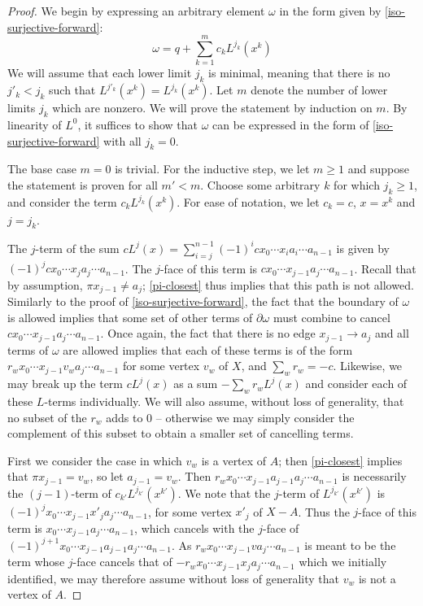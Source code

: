 \documentclass[11pt]{article}
\theoremstyle{definition}
\numberwithin{equation}{section}
\newcommand{\bd}{\partial}
\begin{document}
\begin{proof}
We begin by expressing an arbitrary element $\omega$ in the form given by \cref{iso-surjective-forward}:
\[
\omega = q + \sum_{k=1}^m c_k L^{j_k}(x^k) 
\]
We will assume that each lower limit $j_k$ is minimal, meaning that there is no $j'_k < j_k$ such that $L^{j'_k}(x^k) = L^{j_k}(x^k)$. 
Let $m$ denote the number of lower limits $j_k$ which are nonzero. 
We will prove the statement by induction on $m$. 
By linearity of $L^0$, it suffices to show that $\omega$ can be expressed in the form of \cref{iso-surjective-forward} with all $j_k = 0$. 

The base case $m = 0$ is trivial.
For the inductive step, we let $m \geq 1$ and suppose the statement is proven for all $m' < m$. Choose some arbitrary $k$ for which $j_k \geq 1$, and consider the term $c_k L^{j_k}(x^k)$. For ease of notation, we let $c_k = c$, $x = x^k$ and $j = j_k$.

The $j$-term of the sum $c L^j(x) = \sum_{i = j}^{n-1} (-1)^i c x_0 \cdots x_i a_i \cdots a_{n-1}$ is given by $(-1)^{j} c x_0 \cdots x_j a_j \cdots a_{n-1}$. The $j$-face of this term is $c x_0 \cdots x_{j-1} a_{j} \cdots a_{n-1}$. Recall that by assumption, $\pi x_{j-1} \neq a_j$; \cref{pi-closest} thus implies that this path is not allowed. Similarly to the proof of \cref{iso-surjective-forward}, the fact that the boundary of $\omega$ is allowed implies that some set of other terms of $\bd \omega$ must combine to cancel $c x_0 \cdots x_{j-1} a_{j} \cdots a_{n-1}$. Once again, the fact that there is no edge $x_{j-1} \to a_j$ and all terms of $\omega$ are allowed implies that each of these terms is of the form $r_w x_0 \cdots x_{j-1} v_w a_{j} \cdots a_{n-1}$ for some vertex $v_w$ of $X$, and $\sum_w r_w = -c$. Likewise, we may break up the term $c L^j(x)$ as a sum $-\sum_w r_w L^j(x)$ and consider each of these $L$-terms individually. 
We will also assume, without loss of generality, that no subset of the $r_w$ adds to 0 -- otherwise we may simply consider the complement of this subset to obtain a smaller set of cancelling terms.

First we consider the case in which $v_w$ is a vertex of $A$; then \cref{pi-closest} implies that $\pi x_{j-1} = v_w$, so let $a_{j-1} = v_w$. Then $r_w x_0 \cdots x_{j-1} a_{j-1} a_{j} \cdots a_{n-1}$ is necessarily the $(j-1)$-term of $c_{k'}L^{j_{k'}}(x^{k'})$. We note that the $j$-term of $L^{j_{k'}}(x^{k'})$ is $(-1)^{j}x_0 \cdots x_{j-1} x'_{j} a_{j} \cdots a_{n-1}$, for some vertex $x'_j$ of $X-A$. Thus the $j$-face of this term is $x_0 \cdots x_{j-1} a_{j} \cdots a_{n-1}$, which cancels with the $j$-face of $(-1)^{j+1}x_0 \cdots x_{j-1} a_{j-1} a_{j} \cdots a_{n-1}$. As $r_w x_0 \cdots x_{j-1} v a_{j} \cdots a_{n-1}$ is meant to be the term whose $j$-face cancels that of $-r_w x_0 \cdots x_{j-1} x_j a_{j} \cdots a_{n-1}$ which we initially identified, we may therefore assume without loss of generality that $v_w$ is not a vertex of $A$.


\end{proof}
\end{document}
